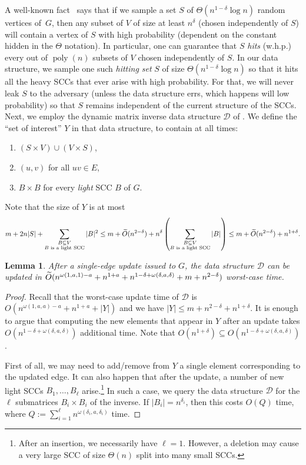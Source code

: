\documentclass[11pt]{article}
\newtheorem{lemma}[theorem]{Lemma}
\newcommand{\poly}[1]{\ensuremath{\operatorname{poly}\left( #1 \right)}\xspace}
\newcommand{\B}[1]{\textrm{{\normalfont B}\( ^{ #1 } \)}\xspace}
\begin{document}
{A well-known fact~\cite{UY91} says
that if we sample a set $S$ of $\Theta(n^{1-\delta}\log{n})$ random vertices of~$G$, then any
subset of $V$ of size at least $n^\delta$ (chosen independently of $S$) will contain
a vertex of $S$ with high probability (dependent on the constant hidden in the $\Theta$ notation). 
In particular, one can guarantee
that $S$ \emph{hits} (w.h.p.) every
out of $\poly{n}$ subsets of $V$
chosen independently of $S$.
In our data structure, 
we sample one such \emph{hitting set} $S$ of
size $\Theta(n^{1-\delta}\log{n})$
so that it hits all the heavy SCCs
that ever arise with high probability. For that, we will never leak $S$ to the adversary (unless the data structure errs, which happens will low probability) so that $S$ remains independent of the current structure of the SCCs.
Next, we employ the dynamic matrix inverse data structure $\mathcal{D}$ of . We define the ``set of interest'' $Y$ in that data structure, to contain at all times:
\begin{enumerate}
\item $(S\times V)\cup (V\times S)$,
\item $(u,v)$ for all $uv\in E$,
\item $B\times B$ for every \emph{light} SCC $B$ of $G$.
\end{enumerate}
Note that the size of $Y$ is at most
\begin{equation*}
m+2n|S|+\sum_{\substack{B\subseteq V\\B\text{ is a light SCC}}}|B|^2\leq m+
\widetilde{O}(n^{2-\delta})+n^\delta\left(\sum_{\substack{B\subseteq V\\B\text{ is a light SCC}}}|B|\right)\leq m+\widetilde{O}(n^{2-\delta})+n^{1+\delta}.
\end{equation*}
\begin{lemma}
    After a single-edge update issued to $G$, the data structure $\mathcal{D}$ can be updated in $\widetilde{O}(n^{\omega(1,a,1)-a}+n^{1+a}+n^{1-\delta+\omega(\delta,a,\delta)}+m+n^{2-\delta})$
    worst-case time.
\end{lemma}
\begin{proof}
Recall that the worst-case update time of $\mathcal{D}$ is $O(n^{\omega(1,a,a)-a}+n^{1+a}+|Y|)$ and we have
$|Y|\leq m+n^{2-\delta}+n^{1+\delta}$. It is enough to argue that computing the
new elements
that appear in $Y$ after an update
takes $O(n^{1-\delta+\omega(\delta,a,\delta)})$ additional time.
Note that $O(n^{1+\delta})\subseteq O(n^{1-\delta+\omega(\delta,a,\delta)})$.

First of all, we may need to add/remove from $Y$ a single element corresponding to the updated edge. It can also happen
that after the update, a number
of new light SCCs $B_1,\ldots,B_\ell$
arise.\footnote{After an insertion, we necessarily have $\ell=1$. However, a deletion may cause a very large SCC of size $\Theta(n)$ split into many small SCCs.} In such a case, we query the
data structure $\mathcal{D}$ for the $\ell$ submatrices $B_i\times B_i$ of the inverse. If $|B_i|=n^{\delta_i}$, then this costs $O(Q)$ time, where $Q:=\sum_{i=1}^\ell n^{\omega(\delta_i,a,\delta_i)}$ time.


\end{proof}}
\end{document}
